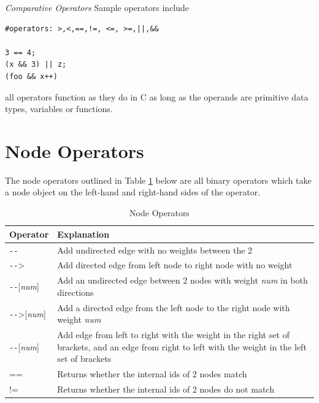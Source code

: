 \documentclass{article}
\begin{document}
\emph{Comparative Operators}
 Sample operators include 
\begin{lstlisting}[language=pltLang, caption=Declaration of ``string'' types., label=lst:ops]
#operators: >,<,==,!=, <=, >=,||,&&

3 == 4; 
(x && 3) || z;
(foo && x++)
\end{lstlisting}

all operators function as they do in C as long as the operands are primitive data types, variables or functions. 

\section{Node Operators}

The node operators outlined in Table \ref{tbl:node-ops} below are all binary operators which take a node object on the left-hand and right-hand sides of the operator.

\begin{table}[H]
\centering
\begin{tabular}{| p{1.5in} | p{2.75in} |}
\hline
Operator & Explanation \\
\hline
\texttt{-{}-} & Add undirected edge with no weights between the 2 \\
\hline
\texttt{-{}-}> & Add directed edge from left node to right node with no weight \\
\hline
\texttt{-{}-}[\emph{num}] & Add an undirected edge between 2 nodes with weight \emph{num} in both directions \\
\hline
\texttt{-{}-}>[\emph{num}] & Add a directed edge from the left node to the right node with weight \emph{num} \\
\hline
[\emph{num}]\texttt{-{}-}[\emph{num}] & Add edge from left to right with the weight in the right set of brackets, and an edge from right to left with the weight in the left set of brackets \\
\hline
== & Returns whether the internal ids of 2 nodes match \\
\hline
!= & Returns whether the internal ids of 2 nodes do not match \\
\hline
\end{tabular}
\caption{Node Operators}
\label{tbl:node-ops}
\end{table}
\end{document}
